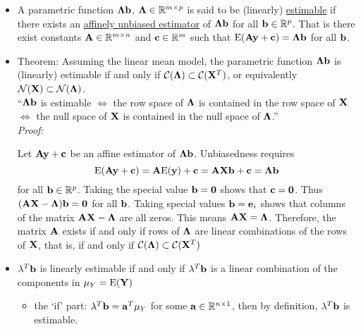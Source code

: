 \begin{itemize}
	\item A parametric function $\mathbf{\Lambda b}$, $\mathbf{\Lambda} \in \mathbb{R}^{m \times p}$ is said to be (linearly) \underline{estimable} if there exists an \underline{affinely unbiased estimator} of $\mathbf{\Lambda b}$ for all $\mathbf{b} \in \mathbb{R}^p$.  That is there exist constants $\mathbf{A}\in \mathbb{R}^{m \times n}$ and $\mathbf{c} \in \mathbb{R}^m$ such that $\mbox{E}(\mathbf{Ay + c}) = \mathbf{\Lambda b}$ for all $\mathbf{b}$.
	\item Theorem: Assuming the linear mean model, the parametric function $\mathbf{\Lambda b}$ is (linearly) estimable if and only if $\mathcal{C}(\mathbf{\Lambda}) \subset \mathcal{C}(\mathbf{X}^T)$, or equivalently $\mathcal{N}(\mathbf{X}) \subset \mathcal{N}(\mathbf{\Lambda})$.\\
	``$\mathbf{\Lambda b}$ is estimable $\iff$ the row space of $\mathbf{\Lambda}$ is contained in the row space of $\mathbf{X}$ $\iff$ the null space of $\mathbf{X}$ is contained in the null space of $\mathbf{\Lambda}$.''\\
	{\it Proof:}
	\begin{pf}
		Let $\mathbf{Ay + c}$ be an affine estimator of $\mathbf{\Lambda b}$.  Unbiasedness requires
		$$
		\mbox{E}(\mathbf{Ay + c}) = \mathbf{A} \mbox{E}(\mathbf{y}) + \mathbf{c} = \mathbf{AXb + c} = \mathbf{\Lambda b}
		$$
		for all $\mathbf{b} \in \mathbb{R}^p$.
		Taking the special value $\mathbf{b} = \mathbf{0}$ shows that $\mathbf{c = 0}$.
		Thus $(\mathbf{AX - \Lambda})\mathbf{b} = \mathbf{0}$ for all $\mathbf{b}$.
		Taking special values $\mathbf{b} = \mathbf{e}_i$ shows that columns of the matrix $\mathbf{AX - \Lambda}$ are all zeros.
		This means $\mathbf{AX} = \mathbf{\Lambda}$.
		Therefore, the matrix $\mathbf{A}$ exists if and only if rows of $\mathbf{\Lambda}$ are linear combinations of the rows of $\mathbf{X}$, that is, if and only if $\mathcal{C}(\mathbf{\Lambda}) \subset \mathcal{C}(\mathbf{X}^T)$		
	\end{pf}
	\item $\mathbf{\lambda} ^T \mathbf{b}$ is linearly estimable if and only if $\lambda ^T \mathbf{b}$ is a linear combination of the components in $\mathbf{\mu}_Y = \mbox{E}(\mathbf{Y})$
	\begin{pf}
		\begin{itemize}
			\item the `if' part: $\mathbf{\lambda}^T \mathbf{b} = \mathbf{a}^T \mathbf{\mu}_Y$ for some $\mathbf{a} \in \mathbb{R}^{n \times 1}$, then by definition, $\mathbf{\lambda}^T \mathbf{b}$ is estimable.

\end{itemize}
\end{pf}
\end{itemize}
